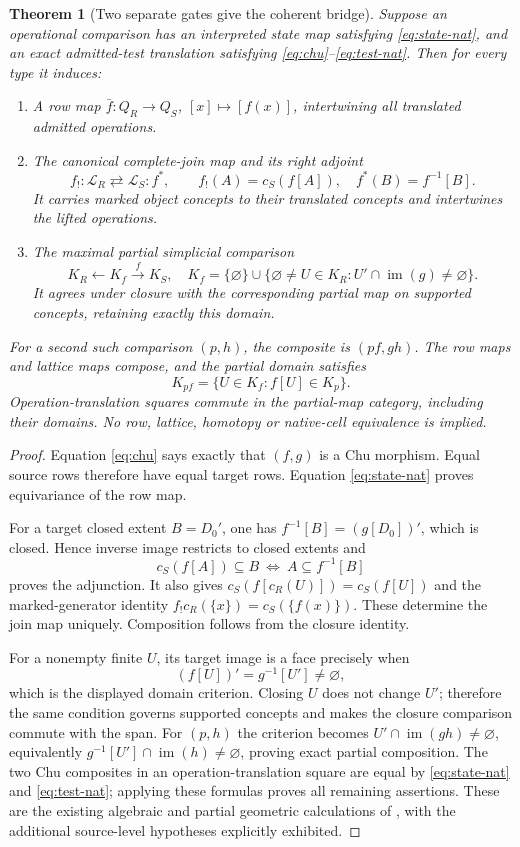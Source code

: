 \documentclass[11pt]{article}
\newtheorem{theorem}{Theorem}[section]
\theoremstyle{definition}\newtheorem{definition}[theorem]{Definition}
\theoremstyle{remark}\newtheorem{remark}[theorem]{Remark}
\newcommand{\im}{\operatorname{im}}
\begin{document}
\begin{theorem}[Two separate gates give the coherent bridge]\label{thm:bridge}
Suppose an operational comparison has an interpreted state map satisfying
\eqref{eq:state-nat}, and an exact admitted-test translation satisfying
\eqref{eq:chu}--\eqref{eq:test-nat}. Then for every type it induces:
\begin{enumerate}
\item A row map $\bar f:Q_R\to Q_S$, $[x]\mapsto[f(x)]$, intertwining
all translated admitted operations.
\item The canonical complete-join map and its right adjoint
\[
 f_!:\mathcal L_R\rightleftarrows\mathcal L_S:f^*,\qquad
 f_!(A)=c_S(f[A]),\quad f^*(B)=f^{-1}[B].
\]
It carries marked object concepts to their translated concepts and
intertwines the lifted operations.
\item The maximal partial simplicial comparison
\[
 K_R\longleftarrow K_f\xrightarrow{f}K_S,
 \quad K_f=\{\varnothing\}\cup
 \{\varnothing\ne U\in K_R:U'\cap\im(g)\ne\varnothing\}.
\]
It agrees under closure with the corresponding partial map on supported
concepts, retaining exactly this domain.
\end{enumerate}
For a second such comparison $(p,h)$, the composite is $(pf,gh)$.
The row maps and lattice maps compose, and the partial domain satisfies
\[
 K_{pf}=\{U\in K_f:f[U]\in K_p\}.
\]
Operation-translation squares commute in the partial-map category, including
their domains. No row, lattice, homotopy or native-cell equivalence is implied.
\end{theorem}
\begin{proof}
Equation \eqref{eq:chu} says exactly that $(f,g)$ is a Chu morphism. Equal
source rows therefore have equal target rows. Equation \eqref{eq:state-nat}
proves equivariance of the row map.

For a target closed extent $B=D_0'$, one has
$f^{-1}[B]=(g[D_0])'$, which is closed. Hence inverse image restricts to
closed extents and
\[
 c_S(f[A])\subseteq B\ \Longleftrightarrow\ A\subseteq f^{-1}[B]
\]
proves the adjunction. It also gives
$c_S(f[c_R(U)])=c_S(f[U])$ and the marked-generator identity
$f_!c_R(\{x\})=c_S(\{f(x)\})$. These determine the join map uniquely.
Composition follows from the closure identity.

For a nonempty finite $U$, its target image is a face precisely when
\[
 (f[U])'=g^{-1}[U']\ne\varnothing,
\]
which is the displayed domain criterion. Closing $U$ does not change $U'$;
therefore the same condition governs supported concepts and makes the closure
comparison commute with the span. For $(p,h)$ the criterion becomes
$U'\cap\im(gh)\ne\varnothing$, equivalently
$g^{-1}[U']\cap\im(h)\ne\varnothing$, proving exact partial composition.
The two Chu composites in an operation-translation square are equal by
\eqref{eq:state-nat} and \eqref{eq:test-nat}; applying these formulas proves
all remaining assertions. These are the existing algebraic and partial
geometric calculations of \cite{Common}, with the additional source-level
hypotheses explicitly exhibited.
\end{proof}
\end{document}

